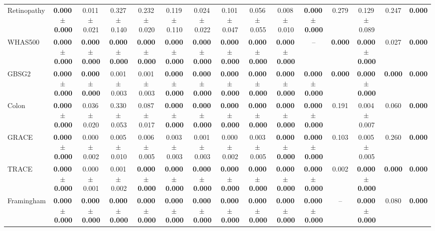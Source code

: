 \documentclass[8pt]{extarticle}
\begin{document}
\begin{longtable}{l*{14}{c}}
Retinopathy & \textbf{0.000\,$\pm$\,0.000} & 0.011\,$\pm$\,0.021 & 0.327\,$\pm$\,0.140 & 0.232\,$\pm$\,0.020 & 0.119\,$\pm$\,0.110 & 0.024\,$\pm$\,0.022 & 0.101\,$\pm$\,0.047 & 0.056\,$\pm$\,0.055 & 0.008\,$\pm$\,0.010 & \textbf{0.000\,$\pm$\,0.000} & 0.279 & 0.129\,$\pm$\,0.089 & 0.247 & \textbf{0.000} \\
WHAS500 & \textbf{0.000\,$\pm$\,0.000} & \textbf{0.000\,$\pm$\,0.000} & \textbf{0.000\,$\pm$\,0.000} & \textbf{0.000\,$\pm$\,0.000} & \textbf{0.000\,$\pm$\,0.000} & \textbf{0.000\,$\pm$\,0.000} & \textbf{0.000\,$\pm$\,0.000} & \textbf{0.000\,$\pm$\,0.000} & \textbf{0.000\,$\pm$\,0.000} & -- & \textbf{0.000} & \textbf{0.000\,$\pm$\,0.000} & 0.027 & \textbf{0.000} \\
GBSG2 & \textbf{0.000\,$\pm$\,0.000} & \textbf{0.000\,$\pm$\,0.000} & 0.001\,$\pm$\,0.003 & 0.001\,$\pm$\,0.003 & \textbf{0.000\,$\pm$\,0.000} & \textbf{0.000\,$\pm$\,0.000} & \textbf{0.000\,$\pm$\,0.000} & \textbf{0.000\,$\pm$\,0.000} & \textbf{0.000\,$\pm$\,0.000} & \textbf{0.000\,$\pm$\,0.000} & \textbf{0.000} & \textbf{0.000\,$\pm$\,0.000} & \textbf{0.000} & \textbf{0.000} \\
Colon & \textbf{0.000\,$\pm$\,0.000} & 0.036\,$\pm$\,0.020 & 0.330\,$\pm$\,0.053 & 0.087\,$\pm$\,0.017 & \textbf{0.000\,$\pm$\,0.000} & \textbf{0.000\,$\pm$\,0.000} & \textbf{0.000\,$\pm$\,0.000} & \textbf{0.000\,$\pm$\,0.000} & \textbf{0.000\,$\pm$\,0.000} & \textbf{0.000\,$\pm$\,0.000} & 0.191 & 0.004\,$\pm$\,0.007 & 0.060 & \textbf{0.000} \\
GRACE & \textbf{0.000\,$\pm$\,0.000} & 0.000\,$\pm$\,0.002 & 0.005\,$\pm$\,0.010 & 0.006\,$\pm$\,0.005 & 0.003\,$\pm$\,0.003 & 0.001\,$\pm$\,0.003 & 0.000\,$\pm$\,0.002 & 0.003\,$\pm$\,0.005 & \textbf{0.000\,$\pm$\,0.000} & \textbf{0.000\,$\pm$\,0.000} & 0.103 & 0.005\,$\pm$\,0.005 & 0.260 & \textbf{0.000} \\
TRACE & \textbf{0.000\,$\pm$\,0.000} & 0.000\,$\pm$\,0.001 & 0.001\,$\pm$\,0.002 & \textbf{0.000\,$\pm$\,0.000} & \textbf{0.000\,$\pm$\,0.000} & \textbf{0.000\,$\pm$\,0.000} & \textbf{0.000\,$\pm$\,0.000} & \textbf{0.000\,$\pm$\,0.000} & \textbf{0.000\,$\pm$\,0.000} & \textbf{0.000\,$\pm$\,0.000} & 0.002 & \textbf{0.000\,$\pm$\,0.000} & \textbf{0.000} & \textbf{0.000} \\
Framingham & \textbf{0.000\,$\pm$\,0.000} & \textbf{0.000\,$\pm$\,0.000} & \textbf{0.000\,$\pm$\,0.000} & \textbf{0.000\,$\pm$\,0.000} & \textbf{0.000\,$\pm$\,0.000} & \textbf{0.000\,$\pm$\,0.000} & \textbf{0.000\,$\pm$\,0.000} & \textbf{0.000\,$\pm$\,0.000} & \textbf{0.000\,$\pm$\,0.000} & \textbf{0.000\,$\pm$\,0.000} & -- & \textbf{0.000\,$\pm$\,0.000} & 0.080 & \textbf{0.000} \\

\end{longtable}
\end{document}
